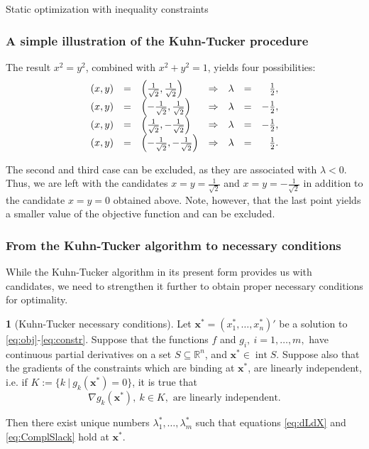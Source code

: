\documentclass[10pt]{beamer}
\DeclareMathOperator*{\interior}{int}
\theoremstyle{definition}
\newtheorem{Fact}{\translate{Fact}}
\begin{document}
\begin{section}{Static optimization with inequality constraints}
\begin{frame}[fragile]
\frametitle{A simple illustration of the Kuhn-Tucker procedure}\addtocounter{theorem}{-1}
\begin{example}[cont.]
The result $ x^2 = y^2 $, combined with $ x^2+y^2 = 1 $, yields four possibilities: \[ \begin{array}{l l l l l l r}
(x,y) & = & \left(\frac{1}{\sqrt{2}},\frac{1}{\sqrt{2}}\right) & \Rightarrow & \lambda &=& \frac{1}{2},\\
(x,y) & = & \left(-\frac{1}{\sqrt{2}},\frac{1}{\sqrt{2}}\right)& \Rightarrow &\lambda &=& -\frac{1}{2},\\
(x,y) & = & \left(\frac{1}{\sqrt{2}},-\frac{1}{\sqrt{2}}\right)& \Rightarrow &\lambda &=& -\frac{1}{2},\\
(x,y) & = & \left(-\frac{1}{\sqrt{2}},-\frac{1}{\sqrt{2}}\right)& \Rightarrow &\lambda &=& \frac{1}{2} .
\end{array} \]

The second and third case can be excluded, as they are associated with $ \lambda<0 $. Thus, we are left with the candidates $ x=y=\frac{1}{\sqrt{2}} $ and $ x=y=-\frac{1}{\sqrt{2}} $ in addition to the candidate $ x=y=0$ obtained above. Note, however, that the last point yields a smaller value of the objective function and can be excluded.
\end{example}
\end{frame}

\begin{frame}[fragile]
\frametitle{From the Kuhn-Tucker algorithm to necessary conditions}
While the Kuhn-Tucker algorithm in its present form provides us with candidates, we need to strengthen it further to obtain proper necessary conditions for optimality.\pause

\begin{Fact}[Kuhn-Tucker necessary conditions]
Let $ \mathbf{x^*}=(x_1^*,\ldots,x_n^*)' $ be a solution to \eqref{eq:obj}-\eqref{eq:constr}. Suppose that the functions $ f $ and $ g_i,~i=1,\ldots,m ,$ have continuous partial derivatives on a set $ S\subseteq \mathbb{R}^n $, and $ \mathbf{x^*} \in \interior S $. Suppose also that the gradients of the constraints which are binding at $ \mathbf{x^*} $, are linearly independent, i.e. if $ K := \{k~\vert~ g_k(\mathbf{x^*})=0\} $, it is true that \[ \nabla g_k(\mathbf{x^*}),~k\in K, \text{ are linearly independent.} \]

Then there exist unique numbers $ \lambda_1^*,\ldots,\lambda_m^* $ such that equations \eqref{eq:dLdX} and \eqref{eq:ComplSlack} hold at $ \mathbf{x^*} $.
\label{fc:KT_NCs}
\end{Fact}\bigskip


\end{frame}
\end{section}
\end{document}
